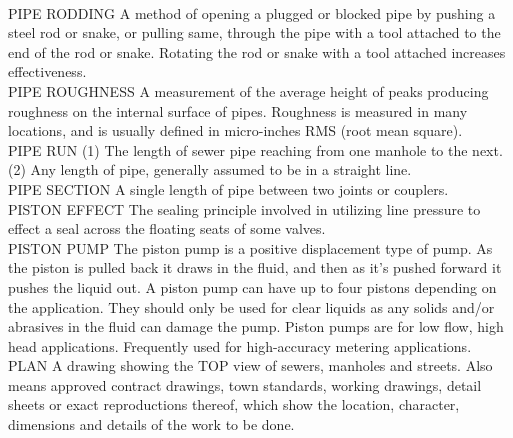 \documentclass{article}
\begin{document}
\vspace{0.3cm}\\
PIPE RODDING
A method of opening a plugged or blocked pipe by pushing a steel rod or snake, or pulling same, through the pipe with a tool attached to the end of the rod or snake. Rotating the rod or snake with a tool attached increases effectiveness.
\vspace{0.3cm}\\
PIPE ROUGHNESS
A measurement of the average height of peaks producing roughness on the internal surface of pipes. Roughness is measured in many locations, and is usually defined in micro-inches RMS (root mean square).
\vspace{0.3cm}\\
PIPE RUN
(1) The length of sewer pipe reaching from one manhole to the next. (2) Any length of pipe, generally assumed to be in a straight line. 
\vspace{0.3cm}\\
PIPE SECTION
A single length of pipe between two joints or couplers. 
\vspace{0.3cm}\\
PISTON EFFECT
The sealing principle involved in utilizing line pressure to effect a seal across the floating seats of some valves.
\vspace{0.3cm}\\
PISTON PUMP
The piston pump is a positive displacement type of pump. As the piston is pulled back it draws in the fluid, and then as it’s pushed forward it pushes the liquid out. A piston pump can have up to four pistons depending on the application. They should only be used for clear liquids as any solids and/or abrasives in the fluid can damage the pump. Piston pumps are for low flow, high head applications. Frequently used for high-accuracy metering applications.
\vspace{0.3cm}\\
PLAN
A drawing showing the TOP view of sewers, manholes and streets. Also means approved contract drawings, town standards, working drawings, detail sheets or exact reproductions thereof, which show the location, character, dimensions and details of the work to be done. 
\vspace{0.3cm}\\
\end{document}
